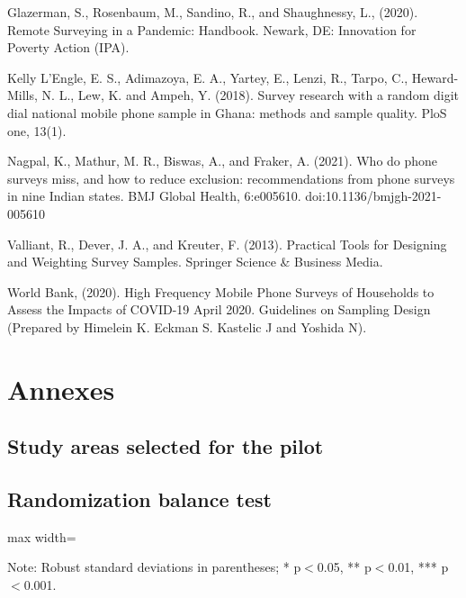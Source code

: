 \documentclass[11pt,harvard]{article}
\begin{document}
	Glazerman, S., Rosenbaum, M., Sandino, R., and Shaughnessy, L., (2020). Remote Surveying in a Pandemic: Handbook. Newark, DE: Innovation for Poverty Action (IPA).
	
	Kelly L’Engle, E. S., Adimazoya, E. A., Yartey, E., Lenzi, R., Tarpo, C., Heward-Mills, N. L., Lew, K. and Ampeh, Y. (2018). Survey research with a random digit dial national mobile phone sample in Ghana: methods and sample quality. PloS one, 13(1).
	
	Nagpal, K., Mathur, M. R., Biswas, A., and Fraker, A. (2021). Who do phone surveys miss, and how to reduce exclusion: recommendations from phone surveys in nine Indian states. BMJ Global Health, 6:e005610. doi:10.1136/bmjgh-2021-005610
	
	Valliant, R., Dever, J. A., and Kreuter, F. (2013). Practical Tools for Designing and Weighting Survey Samples. Springer Science \& Business Media.
	
	World Bank, (2020). High Frequency Mobile Phone Surveys of Households to Assess the Impacts of COVID-19 April 2020. Guidelines on Sampling Design (Prepared by Himelein K. Eckman S. Kastelic J and Yoshida N).
	
	\pagebreak
	
	
	\section{Annexes}
	\subsection{Study areas selected for the pilot}
	
	\label{tab:ADMIN5_BF}
	
	\subsection{Randomization balance test}
	
	\begin{table}[htbp]
		\centering
		\begin{adjustbox}{max width=\textwidth}
			\begin{threeparttable}
				\caption{Balance Table for Randomized Survey Modality Assignment: Face-to-Face vs. Remote}
				\small
				 
				\label{tab:BF_Listing_Demo_Balance_Modality}
				\begin{tablenotes}
					\item Note: Robust standard deviations in parentheses; * p$<$0.05, ** p$<$0.01, *** p$<$0.001. 
				\end{tablenotes}
			\end{threeparttable}
		\end{adjustbox}
	\end{table}
	
\end{document}
